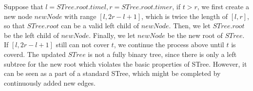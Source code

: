 \documentclass[10pt,journal,compsoc]{IEEEtran}
\begin{document}
Suppose that $ l=STree.root.timel,r=STree.root.timer $, if $ t>r $, we first create a new node $ newNode $ with range $ [l,2r-l+1] $, which is twice the length of $ [l,r] $, so that $ STree.root $ can be a valid left child of $ newNode $. Then, we let $ STree.root $ be the left child of $ newNode $. Finally, we let $ newNode $ be the new root of $ STree $. If $ [l,2r-l+1] $ still can not cover $ t $, we continue the process above until $ t $ is coverd. The updated $ STree $ is not a fully binary tree, since there is only a left subtree for the new root which violates the basic properties of STree. However, it can be seen as a part of a standard STree, which might be completed by continuously added new edges.

\end{document}
